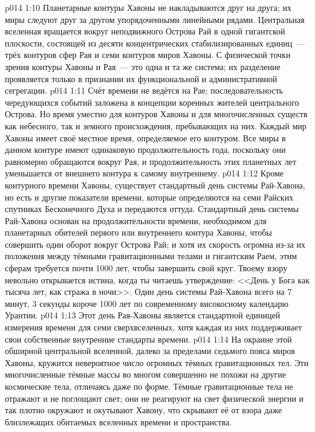 \vs p014 1:10 Планетарные контуры Хавоны не накладываются друг на друга; их миры следуют друг за другом упорядоченными линейными рядами. Центральная вселенная вращается вокруг неподвижного Острова Рай в одной гигантской плоскости, состоящей из десяти концентрических стабилизированных единиц~--- трёх контуров сфер Рая и семи контуров миров Хавоны. С физической точки зрения контуры Хавоны и Рая~--- это одна и та же система; их разделение проявляется только в признании их функциональной и административной сегрегации.
\vs p014 1:11 \pc Счёт времени не ведётся на Рае; последовательность чередующихся событий заложена в концепции коренных жителей центрального Острова. Но время уместно для контуров Хавоны и для многочисленных существ как небесного, так и земного происхождения, пребывающих на них. Каждый мир Хавоны имеет своё местное время, определяемое его контуром. Все миры в данном контуре имеют одинаковую продолжительность года, поскольку они равномерно обращаются вокруг Рая, и продолжительность этих планетных лет уменьшается от внешнего контура к самому внутреннему.
\vs p014 1:12 Кроме контурного времени Хавоны, существует стандартный день системы Рай\hyp{}Хавона, но есть и другие показатели времени, которые определяются на семи Райских спутниках Бесконечного Духа и передаются оттуда. Стандартный день системы Рай\hyp{}Хавона основан на продолжительности времени, необходимом для планетарных обителей первого или внутреннего контура Хавоны, чтобы совершить один оборот вокруг Острова Рай; и хотя их скорость огромна из-за их положения между тёмными гравитационными телами и гигантским Раем, этим сферам требуется почти 1000 лет, чтобы завершить свой круг. Твоему взору невольно открывается истина, когда ты читаешь утверждение: <<День у Бога как тысяча лет, как стража в ночи>>. Один день системы Рай\hyp{}Хавона всего на 7 минут, 3 секунды короче 1000 лет по современному високосному календарю Урантии.
\vs p014 1:13 Этот день Рая\hyp{}Хавоны является стандартной единицей измерения времени для семи сверхвселенных, хотя каждая из них поддерживает свои собственные внутренние стандарты времени.
\vs p014 1:14 \pc На окраине этой обширной центральной вселенной, далеко за пределами седьмого пояса миров Хавоны, кружится невероятное число огромных тёмных гравитационных тел. Эти многочисленные тёмные массы во многом совершенно не похожи на другие космические тела, отличаясь даже по форме. Тёмные гравитационные тела не отражают и не поглощают свет; они не реагируют на свет физической энергии и так плотно окружают и окутывают Хавону, что скрывают её от взора даже близлежащих обитаемых вселенных времени и пространства.
